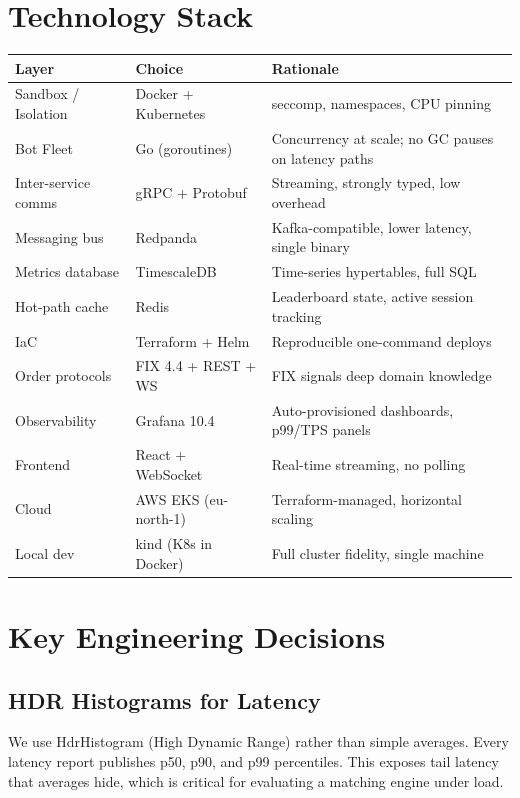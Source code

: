 \documentclass[12pt,a4paper]{article}
\begin{document}
\section{Technology Stack}

\begin{longtable}{L{3.5cm} L{3.8cm} L{6cm}}
  \toprule
  \textbf{Layer} & \textbf{Choice} & \textbf{Rationale} \\
  \midrule
  \endhead
  Sandbox / Isolation   & Docker + Kubernetes   & seccomp, namespaces, CPU pinning \\
  Bot Fleet             & Go (goroutines)       & Concurrency at scale; no GC pauses on latency paths \\
  Inter-service comms   & gRPC + Protobuf       & Streaming, strongly typed, low overhead \\
  Messaging bus         & Redpanda              & Kafka-compatible, lower latency, single binary \\
  Metrics database      & TimescaleDB           & Time-series hypertables, full SQL \\
  Hot-path cache        & Redis                 & Leaderboard state, active session tracking \\
  IaC                   & Terraform + Helm      & Reproducible one-command deploys \\
  Order protocols       & FIX 4.4 + REST + WS   & FIX signals deep domain knowledge \\
  Observability         & Grafana 10.4          & Auto-provisioned dashboards, p99/TPS panels \\
  Frontend              & React + WebSocket     & Real-time streaming, no polling \\
  Cloud                 & AWS EKS (eu-north-1)  & Terraform-managed, horizontal scaling \\
  Local dev             & kind (K8s in Docker)  & Full cluster fidelity, single machine \\
  \bottomrule
\end{longtable}

\section{Key Engineering Decisions}

\subsection{HDR Histograms for Latency}
We use HdrHistogram (High Dynamic Range) rather than simple averages. Every latency report publishes p50, p90, and p99 percentiles. This exposes tail latency that averages hide, which is critical for evaluating a matching engine under load.
\end{document}
